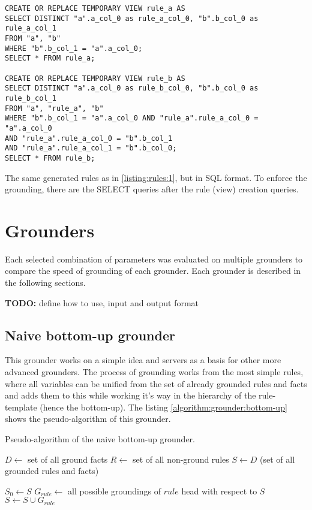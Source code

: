 \documentclass[12pt,oneside]{article}
\begin{document}
\begin{listing}
 \begin{verbatim}
CREATE OR REPLACE TEMPORARY VIEW rule_a AS
SELECT DISTINCT "a".a_col_0 as rule_a_col_0, "b".b_col_0 as rule_a_col_1
FROM "a", "b"
WHERE "b".b_col_1 = "a".a_col_0;
SELECT * FROM rule_a;

CREATE OR REPLACE TEMPORARY VIEW rule_b AS
SELECT DISTINCT "a".a_col_0 as rule_b_col_0, "b".b_col_0 as rule_b_col_1
FROM "a", "rule_a", "b"
WHERE "b".b_col_1 = "a".a_col_0 AND "rule_a".rule_a_col_0 = "a".a_col_0
AND "rule_a".rule_a_col_0 = "b".b_col_1
AND "rule_a".rule_a_col_1 = "b".b_col_0;
SELECT * FROM rule_b;
 \end{verbatim}
\caption{The same generated rules as in \ref{listing:rules:1}, but in SQL format. To enforce the
grounding, there are the SELECT queries after the rule (view) creation queries.}
\label{listing:rules:2}
\end{listing}




\section[something]{Grounders}
Each selected combination of parameters was evaluated on multiple grounders to compare the speed of
grounding of each grounder. Each grounder is described in the following sections.

\textbf{TODO:} define how to use, input and output format

\subsection{Naive bottom-up grounder}
This grounder works on a simple idea and servers as a basis for other more advanced grounders. The
process of grounding works from the most simple rules, where all variables can be unified from the
set of already grounded rules and facts and adds them to this while working it's way in the
hierarchy of the rule-template (hence the bottom-up). The listing
\ref{algorithm:grounder:bottom-up} shows the pseudo-algorithm of this grounder.

\begin{algorithm}
\caption{Pseudo-algorithm of the naive bottom-up grounder.}
\label{algorithm:grounder:bottom-up}
\begin{algorithmic}[1]
\STATE $D \gets$ set of all ground facts
\STATE $R \gets$ set of all non-ground rules
\STATE $S \gets D$ (set of all grounded rules and facts)

\REPEAT
 \STATE $S_0 \gets S$
   \STATE $G_{rule} \gets$ all possible groundings of $rule$ head with respect to $S$
   \STATE $S \gets S \cup G_{rule}$
 \ENDFOR
{}
\end{algorithmic}
\end{algorithm}
\end{document}
